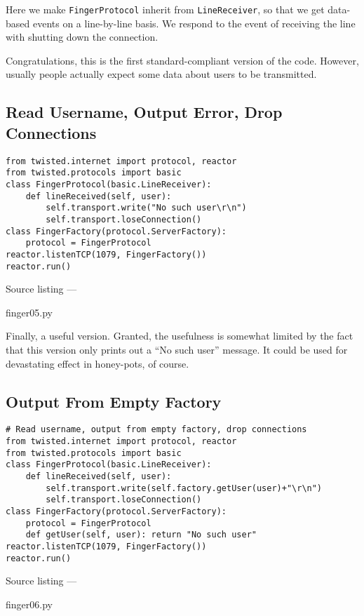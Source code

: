 Here we make \texttt{Finger\linebreak[1]Protocol} inherit from \texttt{Line\linebreak[1]Receiver}, so that we get data-based events on a line-by-line basis. We respond to the event of receiving the line with shutting down the connection. 

Congratulations, this is the first standard-compliant version of the code. However, usually people actually expect some data about users to be transmitted.

\subsection{Read Username, Output Error, Drop Connections}
\begin{verbatim}
from twisted.internet import protocol, reactor
from twisted.protocols import basic
class FingerProtocol(basic.LineReceiver):
    def lineReceived(self, user):
        self.transport.write("No such user\r\n")
        self.transport.loseConnection()
class FingerFactory(protocol.ServerFactory):
    protocol = FingerProtocol
reactor.listenTCP(1079, FingerFactory())
reactor.run()
\end{verbatim}\parbox[b]{\linewidth}{\begin{center}Source listing --- \begin{em}finger05.py\end{em}\end{center}}

Finally, a useful version. Granted, the usefulness is somewhat limited by the fact that this version only prints out a ``No such user'' message. It could be used for devastating effect in honey-pots, of course.

\subsection{Output From Empty Factory}
\begin{verbatim}
# Read username, output from empty factory, drop connections
from twisted.internet import protocol, reactor
from twisted.protocols import basic
class FingerProtocol(basic.LineReceiver):
    def lineReceived(self, user):
        self.transport.write(self.factory.getUser(user)+"\r\n")
        self.transport.loseConnection()
class FingerFactory(protocol.ServerFactory):
    protocol = FingerProtocol
    def getUser(self, user): return "No such user"
reactor.listenTCP(1079, FingerFactory())
reactor.run()
\end{verbatim}\parbox[b]{\linewidth}{\begin{center}Source listing --- \begin{em}finger06.py\end{em}\end{center}}

